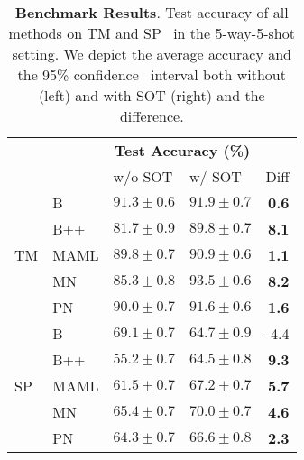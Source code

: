 \begin{table}[h]
\caption{\textbf{Benchmark Results}. Test accuracy of all methods on TM and SP     \ in the 5-way-5-shot setting. We depict the average accuracy and the 95\% confidence      \ interval both without (left) and with SOT (right) and the difference.}
\label{tab:tuned-benchmark}
\vspace{3.5pt}
\centering
\begin{tabular}{llllr}
\toprule
& & \multicolumn{2}{c}{\textbf{Test Accuracy (\%)}} &  \\
 &  & w/o SOT & w/ SOT & Diff \\
\midrule
\multirow[c]{5}{*}{TM} & B & $\mathbf{91.3 \pm 0.6}$ & $91.9 \pm 0.7$ & \bfseries \color{teal} 0.6 \\
 & B++ & $81.7 \pm 0.9$ & $89.8 \pm 0.7$ & \bfseries \color{teal} 8.1 \\
 & MAML & $89.8 \pm 0.7$ & $90.9 \pm 0.6$ & \bfseries \color{teal} 1.1 \\
 & MN & $85.3 \pm 0.8$ & $\mathbf{93.5 \pm 0.6}$ & \bfseries \color{teal} 8.2 \\
 & PN & $90.0 \pm 0.7$ & $91.6 \pm 0.6$ & \bfseries \color{teal} 1.6 \\
\midrule
\multirow[c]{5}{*}{SP} & B & $\mathbf{69.1 \pm 0.7}$ & $64.7 \pm 0.9$ & \color{red} -4.4 \\
 & B++ & $55.2 \pm 0.7$ & $64.5 \pm 0.8$ & \bfseries \color{teal} 9.3 \\
 & MAML & $61.5 \pm 0.7$ & $67.2 \pm 0.7$ & \bfseries \color{teal} 5.7 \\
 & MN & $65.4 \pm 0.7$ & $\mathbf{70.0 \pm 0.7}$ & \bfseries \color{teal} 4.6 \\
 & PN & $64.3 \pm 0.7$ & $66.6 \pm 0.8$ & \bfseries \color{teal} 2.3 \\
\bottomrule
\end{tabular}
\end{table}